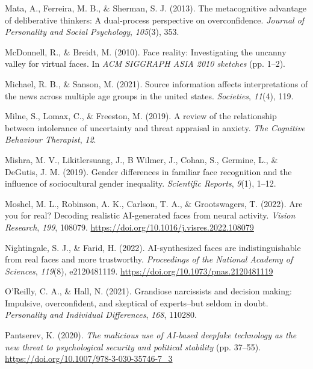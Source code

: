 \documentclass[
  man,floatsintext]{apa6}
\newlength{\cslhangindent}
\newlength{\cslentryspacingunit} %
\newenvironment{CSLReferences}[2] %
 {%
  \setlength{\parindent}{0pt}
  \ifodd #1
  \let\oldpar\par
  \def\par{\hangindent=\cslhangindent\oldpar}
  \fi
  \setlength{\parskip}{#2\cslentryspacingunit}
 }%
 {}
\begin{document}
\begin{CSLReferences}{1}{0}
\leavevmode{}%
Mata, A., Ferreira, M. B., \& Sherman, S. J. (2013). The metacognitive advantage of deliberative thinkers: A dual-process perspective on overconfidence. \emph{Journal of Personality and Social Psychology}, \emph{105}(3), 353.

\leavevmode{}%
McDonnell, R., \& Breidt, M. (2010). Face reality: Investigating the uncanny valley for virtual faces. In \emph{ACM SIGGRAPH ASIA 2010 sketches} (pp. 1--2).

\leavevmode{}%
Michael, R. B., \& Sanson, M. (2021). Source information affects interpretations of the news across multiple age groups in the united states. \emph{Societies}, \emph{11}(4), 119.

\leavevmode{}%
Milne, S., Lomax, C., \& Freeston, M. (2019). A review of the relationship between intolerance of uncertainty and threat appraisal in anxiety. \emph{The Cognitive Behaviour Therapist}, \emph{12}.

\leavevmode{}%
Mishra, M. V., Likitlersuang, J., B Wilmer, J., Cohan, S., Germine, L., \& DeGutis, J. M. (2019). Gender differences in familiar face recognition and the influence of sociocultural gender inequality. \emph{Scientific Reports}, \emph{9}(1), 1--12.

\leavevmode{}%
Moshel, M. L., Robinson, A. K., Carlson, T. A., \& Grootswagers, T. (2022). Are you for real? Decoding realistic AI-generated faces from neural activity. \emph{Vision Research}, \emph{199}, 108079. \url{https://doi.org/10.1016/j.visres.2022.108079}

\leavevmode{}%
Nightingale, S. J., \& Farid, H. (2022). AI-synthesized faces are indistinguishable from real faces and more trustworthy. \emph{Proceedings of the National Academy of Sciences}, \emph{119}(8), e2120481119. \url{https://doi.org/10.1073/pnas.2120481119}

\leavevmode{}%
O'Reilly, C. A., \& Hall, N. (2021). Grandiose narcissists and decision making: Impulsive, overconfident, and skeptical of experts--but seldom in doubt. \emph{Personality and Individual Differences}, \emph{168}, 110280.

\leavevmode{}%
Pantserev, K. (2020). \emph{The malicious use of AI-based deepfake technology as the new threat to psychological security and political stability} (pp. 37--55). \url{https://doi.org/10.1007/978-3-030-35746-7_3}


\end{CSLReferences}
\end{document}

